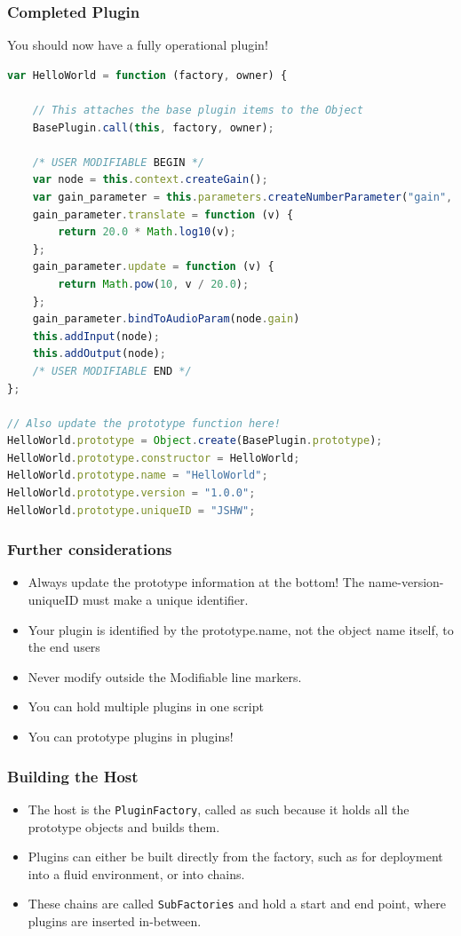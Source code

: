 \documentclass{beamer}
\begin{document}
\begin{frame}[fragile]
\frametitle{Completed Plugin}
You should now have a fully operational plugin!\\
\begin{lstlisting}[language=javascript,basicstyle=\tiny]
var HelloWorld = function (factory, owner) {

    // This attaches the base plugin items to the Object
    BasePlugin.call(this, factory, owner);

    /* USER MODIFIABLE BEGIN */
    var node = this.context.createGain();
    var gain_parameter = this.parameters.createNumberParameter("gain", 0, -12, 12);
    gain_parameter.translate = function (v) {
        return 20.0 * Math.log10(v);
    };
    gain_parameter.update = function (v) {
        return Math.pow(10, v / 20.0);
    };
    gain_parameter.bindToAudioParam(node.gain)
    this.addInput(node);
    this.addOutput(node);
    /* USER MODIFIABLE END */
};

// Also update the prototype function here!
HelloWorld.prototype = Object.create(BasePlugin.prototype);
HelloWorld.prototype.constructor = HelloWorld;
HelloWorld.prototype.name = "HelloWorld";
HelloWorld.prototype.version = "1.0.0";
HelloWorld.prototype.uniqueID = "JSHW";
\end{lstlisting}
\end{frame}

\begin{frame}
\frametitle{Further considerations}
\begin{itemize}
\item Always update the prototype information at the bottom! The name-version-uniqueID must make a unique identifier.
\item Your plugin is identified by the prototype.name, not the object name itself, to the end users
\item Never modify outside the Modifiable line markers.
\item You can hold multiple plugins in one script
\item You can prototype plugins in plugins!
\end{itemize}
\end{frame}

\begin{frame}
\frametitle{Building the Host}
\begin{itemize}
\item The host is the \texttt{PluginFactory}, called as such because it holds all the prototype objects and builds them.
\item Plugins can either be built directly from the factory, such as for deployment into a fluid environment, or into chains.
\item These chains are called \texttt{SubFactories} and hold a start and end point, where plugins are inserted in-between.
\end{itemize}
\end{frame}
\end{document}
